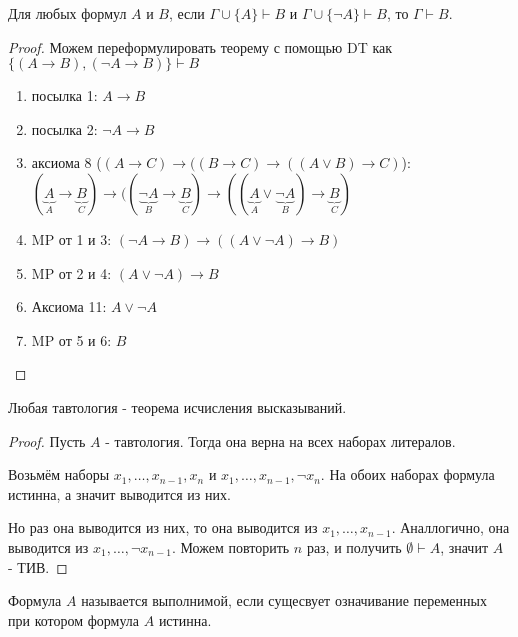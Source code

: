 \begin{lemma} \thmslashn

    Для любых формул $A$ и $B$, если $\Gamma \cup \{A\} \vdash B$ и $\Gamma \cup \{\neg A\} \vdash B $, то $\Gamma \vdash B$.
    \begin{proof} \thmslashn

        Можем переформулировать теорему с помощью DT как $\{(A \to B), (\neg A \to B)\} \vdash B $ 
        \begin{enumerate}
            \item посылка 1: $A\to B$
            \item посылка 2: $\neg A \to B$
            \item аксиома 8 ($(A \to C) \to ((B \to C) \to ((A \lor B) \to C)$): \\
                $(\underbrace{A}_{A} \to \underbrace{B}_{C}) \to ((\underbrace{\neg A}_{B} \to \underbrace{B}_{C}) \to ((\underbrace{A}_{A} \lor \underbrace{\neg A}_{B} ) \to \underbrace{B}_{C} ) $
            \item MP от 1 и 3: $(\neg A \to B) \to ((A \lor \neg A) \to B)$
            \item MP от 2 и 4: $(A \lor \neg A) \to B$
            \item Аксиома 11: $A \lor \neg A$
            \item MP от 5 и 6: $B$ \qedhere
        \end{enumerate}
    \end{proof}
\end{lemma}
\begin{theorem} \thmslashn

    Любая тавтология - теорема исчисления высказываний.
    \begin{proof} \thmslashn

        Пусть $A$ - тавтология. Тогда она верна на всех наборах литералов.

        Возьмём наборы $x_1, \ldots, x_{n-1}, x_{n}$ и $x_1, \ldots, x_{n-1}, \neg x_{n}$. На обоих наборах формула истинна, а значит выводится из них. 

        Но раз она выводится из них, то она выводится из $x_1, \ldots, x_{n-1}$. Аналлогично, она выводится из $x_1, \ldots, \neg x_{n-1}$. Можем повторить $n$ раз, и получить $ \emptyset \vdash A$, значит $A$ - ТИВ.
    \end{proof}
\end{theorem}
\begin{definition} \thmslashn 

    Формула $A$ называется выполнимой, если сущесвует означивание переменных при котором формула $A$  истинна.
\end{definition}
